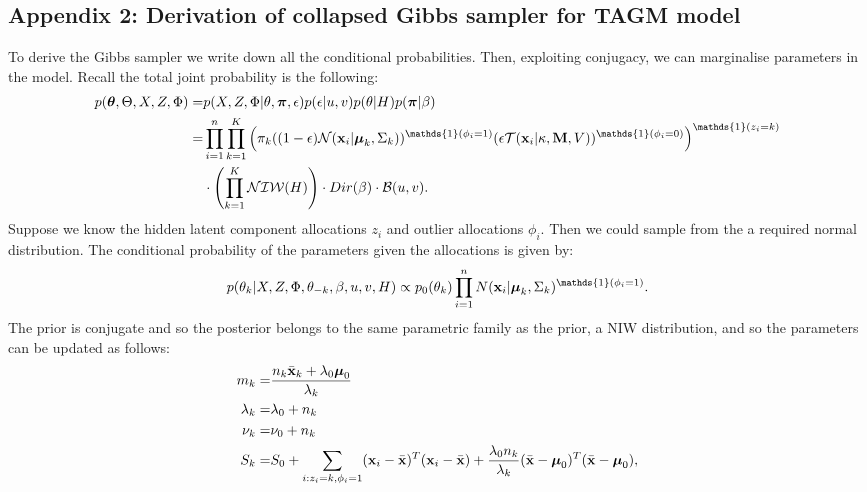 \documentclass[12pt,english]{article}\usepackage[]{graphicx}\usepackage[]{color}
\begin{document}
\subsection{Appendix 2: Derivation of collapsed Gibbs sampler for TAGM model}\label{app::gibbs}
To derive the Gibbs sampler we write down all the conditional probabilities. Then, exploiting conjugacy, we can marginalise parameters in the model. Recall the total joint probability is the following:
\begin{equation}
\begin{split}
p(\boldsymbol{\theta},\Theta, X, Z, \Phi)  = &p(X,Z,\Phi|\theta,\boldsymbol{\pi}, \epsilon)p(\epsilon|u,v)p(\theta|H)p(\boldsymbol{\pi}|\beta)\\
=  & \prod_{i=1}^{n}\prod_{k=1}^{K}\left(\pi_k((1-\epsilon) \mathcal{N}({\bf x}_i|\boldsymbol{\mu}_k, \Sigma_k))^{\mathds{1}(\phi_i = 1)}(\epsilon \mathcal{T}({\bf x}_i|\kappa, {\bf M}, V))^{\mathds{1}(\phi_i = 0)}\right)^{\mathds{1}(z_i=k)}\\
&\cdot \left(\prod_{k=1}^{K}\mathcal{NIW}(H)\right)\cdot Dir(\beta)\cdot \mathcal{B}(u,v). \end{split}
\end{equation}
Suppose we know the hidden latent component allocations $z_i$ and outlier allocations $\phi_i$. Then we could sample from the a required normal distribution. The conditional probability of the parameters given the allocations is given by:
\begin{equation}
\begin{split}
p(\theta_k|X,Z,\Phi, \theta_{-k}, \beta, u,v, H) \propto p_0(\theta_{k})\prod_{i=1}^{n}N({\bf x}_i |\boldsymbol{\mu}_k, \Sigma_k)^{\mathds{1}(\phi_i = 1)}.
\end{split}
\end{equation}
The prior is conjugate and so the posterior belongs to the same parametric family as the prior, a NIW distribution, and so the parameters can be updated as follows:
\begin{equation}
\begin{split}
m_k = & \frac{n_k\bar{{\bf x}}_k + \lambda_0 \boldsymbol{\mu}_0}{\lambda_k}\\
\lambda_k = & \lambda_0 + n_k\\
\nu_k = & \nu_0 + n_k \\
S_k = & S_0 + \sum_{i:z_i = k, \phi_i = 1}({\bf x}_i - \bar{{\bf x}})^{T}({\bf x}_i - \bar{{\bf x}}) + \frac{\lambda_0n_k}{\lambda_k}(\bar{{\bf x}}- \boldsymbol{\mu}_0)^T(\bar{{\bf x}} - \boldsymbol{\mu}_0), \\
\end{split}
\end{equation}
\end{document}

